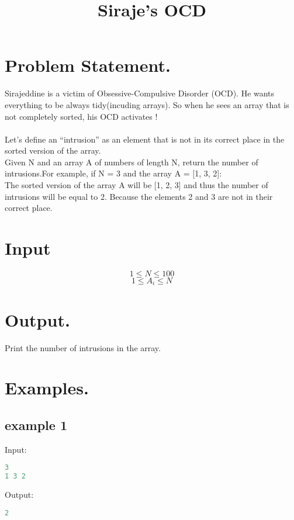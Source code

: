 \documentclass[10pt]{article}
\begin{document}
\title{Siraje's OCD}
 \date{}
\maketitle
\section{Problem Statement.}
Sirajeddine is a victim of Obsessive-Compulsive Disorder (OCD). He wants everything to be always tidy(incuding arrays). So when he sees an array that is not completely sorted, his OCD activates !\\
\\
Let’s define an “intrusion” as an element that is not in its correct place in the sorted version of the array.\\
Given N and an array A of numbers of length N, return the number of intrusions.For example, if N = 3 and the array A = [1, 3, 2]:\\
The sorted version of the array A will be [1, 2, 3] and thus the number of intrusions will be equal to 2. Because the elements 2 and 3 are not in their correct place.
\paragraph{}
\section{Input}
$$ 1\le N \le 100 $$
$$ 1\le A_i \le N $$
\section{Output.}
Print the number of intrusions in the array.
\section{Examples.}
\subsection{example 1}
Input:
\begin{lstlisting}[language=Python]
3
1 3 2
\end{lstlisting}
Output:
\begin{lstlisting}[language=Python]
2
\end{lstlisting}
\end{document}

